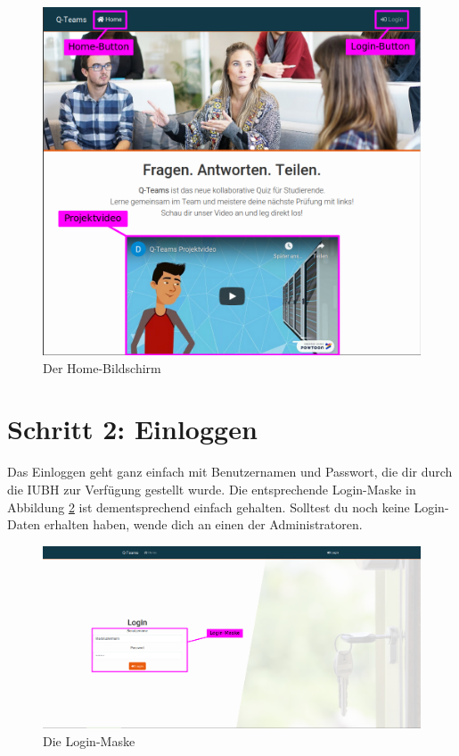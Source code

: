 \documentclass[a4paper,11pt,listof=numbered,glossary=totoc,parskip=half,toc=bib]{scrreprt}
\begin{document}
\begin{appendices}
	\begin{figure}[h!]
		\centering
		\includegraphics[width=\textwidth]{UserGuide/Home.png}
		\caption{Der Home-Bildschirm}
		\label{fig:guide_home}
	\end{figure}
	\newpage
	\section*{Schritt 2: Einloggen}
	
	Das Einloggen geht ganz einfach mit Benutzernamen und Passwort, die dir durch die IUBH zur Verfügung gestellt wurde. Die entsprechende Login-Maske in Abbildung \ref{fig:guide_login} ist dementsprechend einfach gehalten. Solltest du noch keine Login-Daten erhalten haben, wende dich an einen der Administratoren.
	
	\begin{figure}[h!]
		\centering
		\includegraphics[width=\textwidth]{UserGuide/Login.png}
		\caption{Die Login-Maske}
		\label{fig:guide_login}
	\end{figure}
	

\end{appendices}
\end{document}

